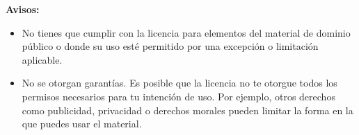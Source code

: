 {\textbf{Avisos:}

\begin{itemize}

\item
  No tienes que cumplir con la licencia para elementos del 
  material de dominio p\'ublico o donde su uso est\'e permitido 
  por una excepci\'on o limitaci\'on aplicable.  

\item
  No se otorgan garant\'ias. Es posible que la licencia no te otorgue 
  todos los permisos necesarios para tu intenci\'on de uso. Por ejemplo, otros 
  derechos como publicidad, privacidad o derechos morales pueden limitar 
  la forma en la que puedes usar el material.

\end{itemize}
}
